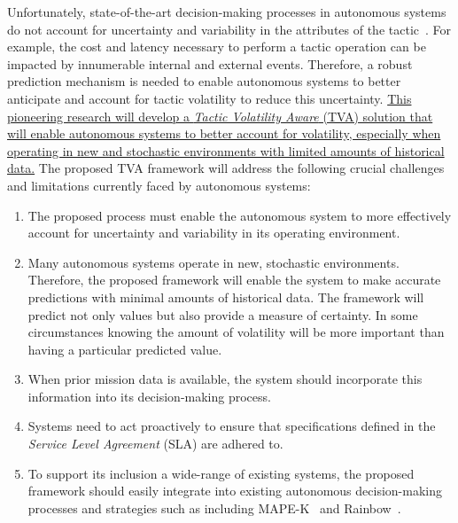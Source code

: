 \documentclass[12pt]{article}
\begin{document}
Unfortunately, state-of-the-art decision-making processes in autonomous systems do not account for uncertainty and variability in the attributes of the tactic~\cite{moreno2017adaptation, Moreno:2017:CMP:3105503.3105511, camara2016analyzing}. For example, the cost and latency necessary to perform a tactic operation can be impacted by innumerable internal and external events.  Therefore, a robust prediction mechanism is needed to enable autonomous systems to better anticipate and account for tactic volatility to reduce this uncertainty. \ul{This pioneering research will develop a \emph{Tactic Volatility Aware} (TVA) solution that will enable autonomous systems to better account for volatility, especially when operating in new and stochastic environments with limited amounts of historical data.} %
The proposed TVA framework will address the following crucial challenges and limitations currently faced by autonomous systems: 

\begin{enumerate}[noitemsep]

	\item The proposed process must enable the autonomous system to more effectively account for uncertainty and variability in its operating environment. 

	\item Many autonomous systems operate in new, stochastic environments. Therefore, the proposed framework will enable the system to make accurate predictions with minimal amounts of historical data. The framework will predict not only values but also provide a measure of certainty. In some circumstances knowing the amount of volatility will be more important than having a particular predicted value.

	\item When prior mission data is available, the system should incorporate this information into its decision-making process.

	\item Systems need to act proactively to ensure that specifications defined in the \emph{Service Level Agreement} (SLA) are adhered to.

	\item To support its inclusion a wide-range of existing systems, the proposed framework should easily integrate into existing autonomous decision-making processes and strategies such as including MAPE-K~\cite{kephart2003vision} and Rainbow~\cite{garlan2004rainbow}.

\end{enumerate}
\end{document}
